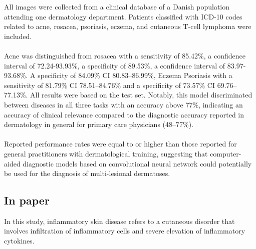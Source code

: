 All images were collected from a clinical database of a Danish population attending one dermatology department. Patients classified with ICD-10 codes related to acne, rosacea, psoriasis, eczema, and cutaneous T-cell lymphoma were included.\\\\

Acne was distinguished from rosacea with a sensitivity of 85.42\%, a confidence interval of 72.24-93.93\%, a specificity of 89.53\%, a confidence interval of 83.97-93.68\%. A specificity of 84.09\% CI 80.83–86.99\%, Eczema Psoriasis with a sensitivity of 81.79\% CI 78.51–84.76\% and a specificity of 73.57\% CI 69.76–77.13\%. All results were based on the test set. Notably, this model discriminated between diseases in all three tasks with an accuracy above 77\%, indicating an accuracy of clinical relevance compared to the diagnostic accuracy reported in dermatology in general for primary care physicians (48–77\%).\\\\

Reported performance rates were equal to or higher than those reported for general practitioners with dermatological training, suggesting that computer-aided diagnostic models based on convolutional neural network could potentially be used for the diagnosis of multi-lesional dermatoses.
\subsection{ In paper\cite{r2}}In this study, inflammatory skin disease refers to a cutaneous disorder that involves infiltration of inflammatory cells and severe elevation of inflammatory cytokines.\\\\

